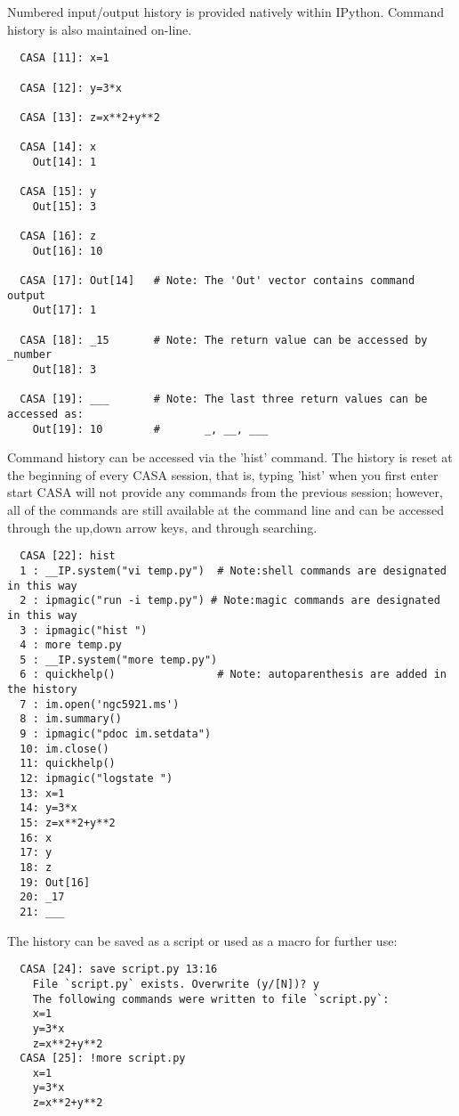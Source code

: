 \vspace{3mm}

Numbered input/output history is provided natively within
IPython. Command history is also maintained on-line. 

\small
\begin{verbatim}
  CASA [11]: x=1

  CASA [12]: y=3*x

  CASA [13]: z=x**2+y**2

  CASA [14]: x
    Out[14]: 1

  CASA [15]: y
    Out[15]: 3

  CASA [16]: z
    Out[16]: 10

  CASA [17]: Out[14]   # Note: The 'Out' vector contains command output
    Out[17]: 1

  CASA [18]: _15       # Note: The return value can be accessed by _number
    Out[18]: 3

  CASA [19]: ___       # Note: The last three return values can be accessed as:
    Out[19]: 10        #       _, __, ___
\end{verbatim}
\normalsize

Command history can be accessed via the 'hist' command. The history is
reset at the beginning of every CASA session, that is, typing 'hist'
when you first enter start CASA will not provide any commands from the
previous session; however, all of the commands are still available at
the command line and can be accessed through the up,down arrow keys,
and through searching. 

\small
\begin{verbatim}
  CASA [22]: hist
  1 : __IP.system("vi temp.py")  # Note:shell commands are designated in this way
  2 : ipmagic("run -i temp.py") # Note:magic commands are designated in this way
  3 : ipmagic("hist ")
  4 : more temp.py
  5 : __IP.system("more temp.py")
  6 : quickhelp()                # Note: autoparenthesis are added in the history
  7 : im.open('ngc5921.ms')
  8 : im.summary()
  9 : ipmagic("pdoc im.setdata")
  10: im.close()
  11: quickhelp()
  12: ipmagic("logstate ")
  13: x=1
  14: y=3*x
  15: z=x**2+y**2
  16: x
  17: y
  18: z
  19: Out[16]
  20: _17
  21: ___
\end{verbatim}
\normalsize

The history can be saved as a script or used as a macro for further use:

\small
\begin{verbatim}
  CASA [24]: save script.py 13:16
    File `script.py` exists. Overwrite (y/[N])? y
    The following commands were written to file `script.py`:
    x=1
    y=3*x
    z=x**2+y**2
  CASA [25]: !more script.py
    x=1
    y=3*x
    z=x**2+y**2
\end{verbatim}
\normalsize

